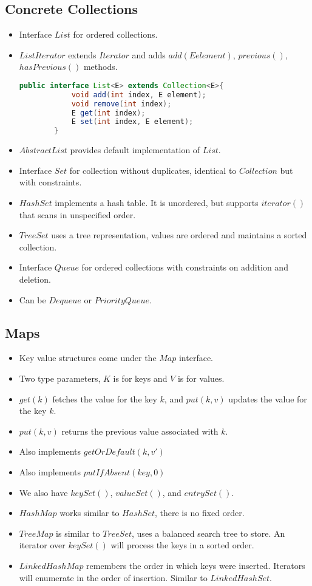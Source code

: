 \documentclass[a4paper]{article}
\begin{document}
\subsection{Concrete Collections}
\begin{itemize}
    \item Interface $List$ for ordered collections.
    \item $ListIterator$ extends $Iterator$ and adds $add(E element)$, $previous()$, $hasPrevious()$ methods.
    \begin{lstlisting}[language=Java]
        public interface List<E> extends Collection<E>{
            void add(int index, E element);
            void remove(int index);
            E get(int index);
            E set(int index, E element);
        }
    \end{lstlisting}
    \item $AbstractList$ provides default implementation of $List$.
    \item Interface $Set$ for collection without duplicates, identical to $Collection$ but with constraints.
    \item $HashSet$ implements a hash table. It is unordered, but supports $iterator()$ that scans in unspecified order.
    \item $TreeSet$ uses a tree representation, values are ordered and maintains a sorted collection.
    \item Interface $Queue$ for ordered collections with constraints on addition and deletion.
    \item Can be $Dequeue$ or $PriorityQueue$.
\end{itemize}

\subsection{Maps}
\begin{itemize}
    \item Key value structures come under the $Map$ interface.
    \item Two type parameters, $K$ is for keys and $V$ is for values.
    \item $get(k)$ fetches the value for the key $k$, and $put(k, v)$ updates the value for the key $k$.
    \item $put(k,v)$ returns the previous value associated with $k$.
    \item Also implements $getOrDefault(k, v')$
    \item Also implements $putIfAbsent(key, 0)$
    \item We also have $keySet()$, $valueSet()$, and $entrySet()$.
    \item $HashMap$ works similar to $HashSet$, there is no fixed order.
    \item $TreeMap$ is similar to $TreeSet$, uses a balanced search tree to store. An iterator over $keySet()$ will process the keys in a sorted order.
    \item $LinkedHashMap$ remembers the order in which keys were inserted. Iterators will enumerate in the order of insertion. Similar to $LinkedHashSet$.
\end{itemize}
\end{document}
